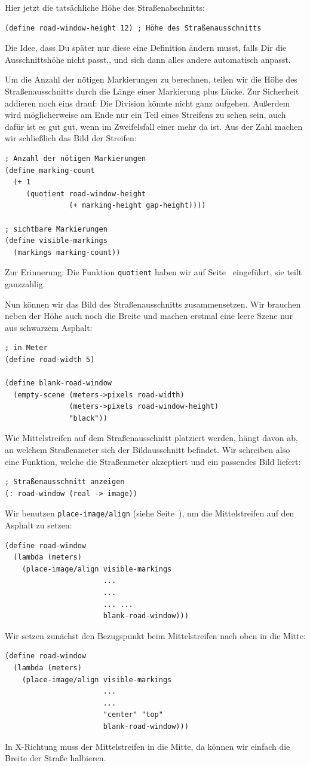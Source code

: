 %
Hier jetzt die tatsächliche Höhe des Straßenabschnitts:
%
\begin{lstlisting}
(define road-window-height 12) ; Höhe des Straßenausschnitts
\end{lstlisting}
%
Die Idee, dass Du später nur diese eine Definition ändern musst, falls
Dir die Ausschnittshöhe nicht passt,, und sich dann alles andere
automatisch anpasst.

Um die Anzahl der nötigen Markierungen zu berechnen, teilen wir die
Höhe des Straßenausschnitts durch die Länge einer Markierung plus
Lücke.  Zur Sicherheit addieren noch eins drauf: Die Division könnte
nicht ganz aufgehen.  Außerdem wird möglicherweise am Ende nur ein
Teil eines Streifens zu sehen sein, auch dafür ist es gut gut, wenn im
Zweifelsfall einer mehr da ist.  Aus der Zahl machen wir schließlich
das Bild der Streifen:
%
\begin{lstlisting}
; Anzahl der nötigen Markierungen
(define marking-count
  (+ 1
     (quotient road-window-height
               (+ marking-height gap-height))))

; sichtbare Markierungen
(define visible-markings
  (markings marking-count))
\end{lstlisting}
%
Zur Erinnerung: Die Funktion \lstinline{quotient} haben wir auf
Seite~\pageref{func:quotient} eingeführt, sie teilt ganzzahlig.

Nun können wir das Bild des Straßenausschnitts zusammensetzen.  Wir
brauchen neben der Höhe auch noch die Breite und machen erstmal eine
leere Szene nur aus schwarzem Asphalt:
%
\begin{lstlisting}
; in Meter
(define road-width 5)

(define blank-road-window
  (empty-scene (meters->pixels road-width)
               (meters->pixels road-window-height)
               "black"))
\end{lstlisting}
%
Wie Mittelstreifen auf dem Straßenausschnitt platziert werden, hängt
davon ab, an welchem Straßenmeter sich der Bildausschnitt befindet.
Wir schreiben also eine Funktion, welche die Straßenmeter akzeptiert
und ein passendes Bild liefert:
\begin{lstlisting}
; Straßenausschnitt anzeigen
(: road-window (real -> image))
\end{lstlisting}
%
Wir benutzen \lstinline{place-image/align} (siehe
Seite~\pageref{func:place-image-align}), um die Mittelstreifen auf den
Asphalt zu setzen:
%
\begin{lstlisting}
(define road-window
  (lambda (meters)
    (place-image/align visible-markings
                       ...
                       ...
                       ... ...
                       blank-road-window)))
\end{lstlisting}
%
Wir setzen zunächst den Bezugspunkt beim Mittelstreifen nach oben in
die Mitte:
%
\begin{lstlisting}
(define road-window
  (lambda (meters)
    (place-image/align visible-markings
                       ...
                       ...
                       "center" "top"
                       blank-road-window)))
\end{lstlisting}
%
In X-Richtung muss der Mittelstreifen in die Mitte, da können wir
einfach die Breite der Straße halbieren.

